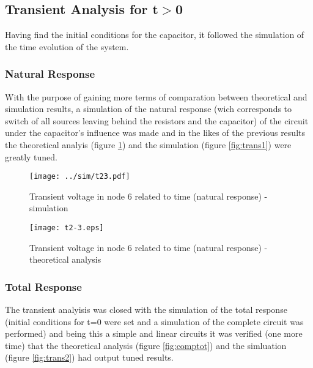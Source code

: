 
\vspace{-3mm}
\subsection{Transient Analysis for t$>$0}

Having find the initial conditions for the capacitor, it followed the simulation of the time evolution of the system.

\subsubsection{Natural Response}

With the purpose of gaining more terms of comparation between theoretical and simulation results, a simulation of the natural response (wich corresponds to switch of all sources leaving behind the resistors and the capacitor) of the circuit under the capacitor's influence was made and in the likes of the previous results the theoretical analyis (figure \ref{fig:compnat}) and the simulation (figure \ref{fig:trans1}) were greatly tuned.

\vspace{-70mm}
\begin{figure}[h] \centering
  \begin{minipage}{.5\textwidth}
    \texttt{[image: ../sim/t23.pdf]}
    \caption{Transient voltage in node 6 related to time (natural response) - simulation}
    \label{fig:trans1}
    \end{minipage}%
  \begin{minipage}{.5\textwidth}
  \centering
    \texttt{[image: t2-3.eps]}
    \caption{Transient voltage in node 6 related to time (natural response) - theoretical analysis}
    \label{fig:compnat}
      \end{minipage}%
\end{figure}

\newpage
\subsubsection{Total Response}


The transient analyisis was closed with the simulation of the total response (initial conditions for t=0 were set and a simulation of the complete circuit was performed) and being this a simple and linear circuits it was verified (one more time) that the theoretical analysis (figure \ref{fig:comptot}) and the simluation (figure \ref{fig:trans2}) had output tuned results.


